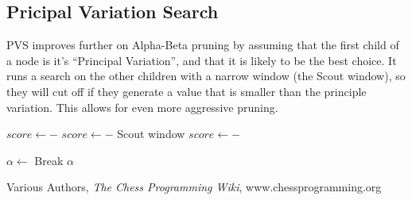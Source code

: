 \documentclass[]{article}
\begin{document}
\subsection{Pricipal Variation Search}
PVS improves further on Alpha-Beta pruning by assuming that the first child of a node
is it's ``Principal Variation'', and that it is likely to be the best choice. It runs a
search on the other children with a narrow window (the Scout window), so they will cut off if they generate
a value that is smaller than the principle variation. This allows for even more aggressive
pruning.
\begin{algorithmic}[1]
  \State \Return {}
  \Else
  \State $score \gets -$ 
  \Else
  \State $score \gets -$ 
  \Comment Scout window
  \EndIf
    \State $score \gets -$ 
    
  \EndIf

  \State $\alpha \gets $ 
  \If{$\alpha \geq \beta$}
  \State Break
  \EndIf
  \EndFor
  \State \Return $\alpha$
  \EndIf
  \EndProcedure
\end{algorithmic}

\begin{thebibliography}{9}
  Various Authors,
  \textit{The Chess Programming Wiki},
  www.chessprogramming.org
\end{thebibliography}
\end{document}
